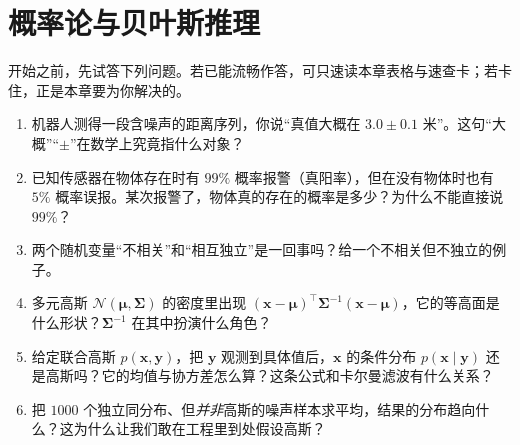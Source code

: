 \chapter{概率论与贝叶斯推理}
\label{ch:prob}


\begin{practice}[前置自测]
开始之前，先试答下列问题。若已能流畅作答，可只速读本章表格与速查卡；若卡住，正是本章要为你解决的。
\begin{enumerate}
  \item 机器人测得一段含噪声的距离序列，你说“真值大概在 $3.0\pm0.1$ 米”。这句“大概”“$\pm$”在数学上究竟指什么对象？
  \item 已知传感器在物体存在时有 $99\%$ 概率报警（真阳率），但在没有物体时也有 $5\%$ 概率误报。某次报警了，物体真的存在的概率是多少？为什么不能直接说 $99\%$？
  \item 两个随机变量“不相关”和“相互独立”是一回事吗？给一个不相关但不独立的例子。
  \item 多元高斯 $\mathcal{N}(\boldsymbol{\mu},\boldsymbol{\Sigma})$ 的密度里出现 $(\mathbf{x}-\boldsymbol{\mu})^\top\boldsymbol{\Sigma}^{-1}(\mathbf{x}-\boldsymbol{\mu})$，它的等高面是什么形状？$\boldsymbol{\Sigma}^{-1}$ 在其中扮演什么角色？
  \item 给定联合高斯 $p(\mathbf{x},\mathbf{y})$，把 $\mathbf{y}$ 观测到具体值后，$\mathbf{x}$ 的条件分布 $p(\mathbf{x}\mid\mathbf{y})$ 还是高斯吗？它的均值与协方差怎么算？这条公式和卡尔曼滤波有什么关系？
  \item 把 $1000$ 个独立同分布、但\emph{并非}高斯的噪声样本求平均，结果的分布趋向什么？这为什么让我们敢在工程里到处假设高斯？
\end{enumerate}
\end{practice}

